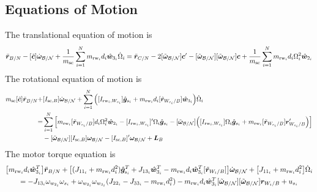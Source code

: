 \documentclass[]{BasiliskReportMemo}
\begin{document}
\subsection{Equations of Motion}
The translational equation of motion is
\begin{equation}
	\ddot{\bm r}_{B/N} -[\tilde{\bm{c}}]\dot{\bm\omega}_{\cal B/N} +\frac{1}{m_{\text{sc}}}\sum\limits_{i=1}^{N}m_{\text{rw}_i}d_i\hat{\bm{w}}_{3_i}\dot{\Omega}_i = \ddot{\bm r}_{C/N}   - 2[\tilde{\bm\omega}_{\cal B/N}]\bm{c}'-[\tilde{\bm\omega}_{\cal B/N}][\tilde{\bm\omega}_{\cal B/N}]\bm{c} + \frac{1}{m_{\text{sc}}}\sum\limits_{i=1}^{N}m_{\text{rw}_i}d_i\Omega_i^2\hat{\bm{w}}_{2_i}
	\label{eq:rBddot}
\end{equation}
The rotational equation of motion is
\begin{equation}
	\begin{split}
		m_{\text{sc}}[\tilde{\bm c}]\ddot{\bm r}_{B/N} +& [I_{\text{sc},B}]\dot{\bm\omega}_{\cal B/N} +\sum\limits_{i=1}^{N}\Big([I_{\text{rw}_i,W_{c_i}}]\hat{\bm{g}}_{s_i} + m_{\text{rw}_i}d_i[\tilde{\bm{r}}_{W_{c_i}/B}]\hat{\bm{w}}_{3_i}\Big)\dot{\Omega}_i
		\\=& 
		\sum\limits_{i=1}^{N}\Big[ m_{\text{rw}_i}[\tilde{\bm{r}}_{W_{c_i}/B}]d_i \Omega_i^2\hat{\bm{w}}_{2_i}-[I_{\text{rw}_i,W_{c_i}}]'\Omega_i \hat{\bm{g}}_{s_i} -[\tilde{\bm\omega}_{\cal B/N}]\Big([I_{\text{rw}_i,W_{c_i}}]\Omega_i \hat{\bm{g}}_{s_i}+ m_{\text{rw}_i}[\tilde{\bm{r}}_{W_{c_i}/B}]\bm{r}'_{W_{c_i}/B}\Big)\Big]
		\\&  -[\tilde{\bm\omega}_{\cal B/N}][I_{\text{sc},B}]\bm\omega_{\cal B/N}-  [I_{\text{sc},B}]'\bm\omega_{\cal B/N} + \bm{L}_B
	\end{split}
	\label{eq:rotationalEOM}
\end{equation}
The motor torque equation is
\begin{multline}
	\big[m_{\text{rw}_i} d_i \hat{\bm{w}}_{3_i}^T\big]\ddot{\bm{r}}_{B/N} + \big[(J_{11_i} + m_{\text{rw}_i} d_i^2)\hat{\bm g}_{\text{s}_i}^T  + J_{13_i}\hat{\bm w}_{3_i}^T -m_{\text{rw}_i} d_i \hat{\bm{w}}_{3_i}^T [\tilde{\bm r}_{W_i/B}]\big]\dot{\bm\omega}_{\cal B/N} + \big[J_{11_i} + m_{\text{rw}_i} d_i^2\big]\dot{\Omega}_i
	\\=   - J_{13_i} \omega_{w_{2_i}}\omega_{s_i}  
	+ \omega_{w_{2_i}} \omega_{w_{3_i}} (J_{22_i} - J_{33_i} - m_{\text{rw}_i} d_i^2
	) 
	 -m_{\text{rw}_i} d_i \hat{\bm{w}}_{3_i}^T [\tilde{\bm\omega}_{\cal B/N}] [\tilde{\bm\omega}_{\cal B/N}] \bm r_{W_i/B} + u_{s_i}
	\label{eq:motorTorqueFinal}
\end{multline}
\end{document}
